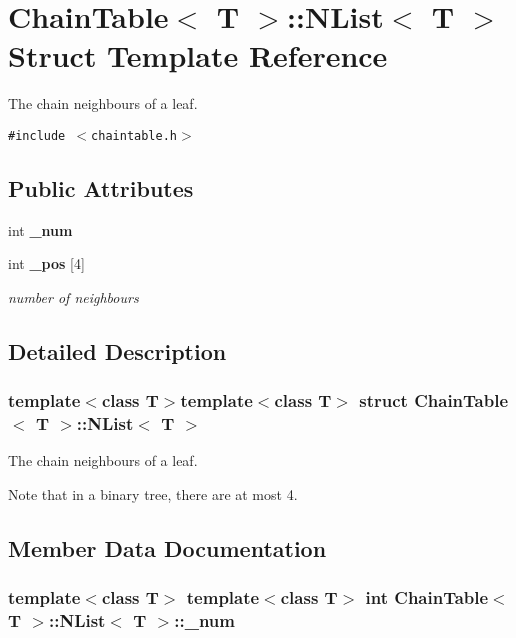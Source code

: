 \section{Chain\-Table$<$ T $>$::NList$<$ T $>$ Struct Template Reference}
\label{structChainTable_1_1NList}
The chain neighbours of a leaf.  


{\tt \#include $<$chaintable.h$>$}

\subsection*{Public Attributes}
\begin{CompactItemize}
\item 
int {\bf \_\-num}
\item 
int {\bf \_\-pos} [4]
\begin{CompactList}\small\item\em number of neighbours \item\end{CompactList}\end{CompactItemize}


\subsection{Detailed Description}
\subsubsection*{template$<$class T$>$template$<$class T$>$ struct Chain\-Table$<$ T $>$::NList$<$ T $>$}

The chain neighbours of a leaf. 

Note that in a binary tree, there are at most 4. 



\subsection{Member Data Documentation}
\subsubsection{\setlength{\rightskip}{0pt plus 5cm}template$<$class T$>$ template$<$class T$>$ int {\bf Chain\-Table}$<$ T $>$::{\bf NList}$<$ T $>$::{\bf \_\-num}}\label{structChainTable_1_1NList_o0}


